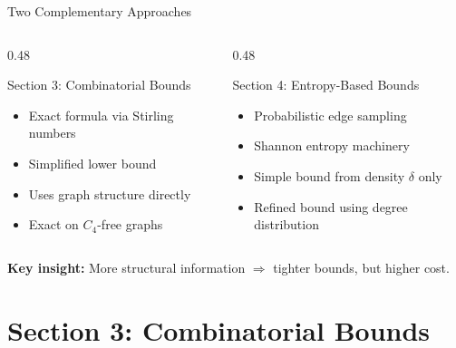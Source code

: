 \documentclass[aspectratio=169]{beamer}
\begin{document}
\begin{frame}{Two Complementary Approaches}
  \begin{columns}
    \begin{column}{0.48\textwidth}
      \begin{block}{Section 3: Combinatorial Bounds}
        \begin{itemize}
          \item Exact formula via Stirling numbers
          \item Simplified lower bound
          \item Uses graph structure directly
          \item Exact on $C_4$-free graphs
        \end{itemize}
      \end{block}
    \end{column}
    \begin{column}{0.48\textwidth}
      \begin{alertblock}{Section 4: Entropy-Based Bounds}
        \begin{itemize}
          \item Probabilistic edge sampling
          \item Shannon entropy machinery
          \item Simple bound from density $\delta$ only
          \item Refined bound using degree distribution
        \end{itemize}
      \end{alertblock}
    \end{column}
  \end{columns}
  \vspace{1em}
  \textbf{Key insight:} More structural information $\Rightarrow$ tighter bounds, but higher cost.
\end{frame}

\section{Section 3: Combinatorial Bounds}
\end{document}

